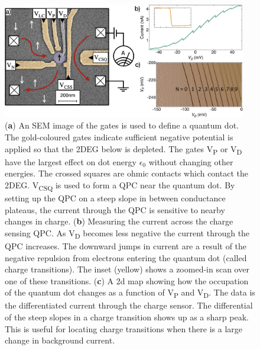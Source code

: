 \begin{figure}[!htb]
 \begin{center}
  \includegraphics[width=0.95\textwidth]{figures/ch1/crop_FiguresMaster.006.png}
  \caption[Charge sensing a quantum dot]{\label{fig:ch1/ct_intro} 
  (\textbf{a}) An SEM image of the gates is used to define a quantum dot. The gold-coloured gates indicate sufficient negative potential is applied so that the 2DEG below is depleted. The gates V\textsubscript{P} or V\textsubscript{D} have the largest effect on dot energy $\epsilon_0$ without changing other energies. The crossed squares are ohmic contacts which contact the 2DEG. V\textsubscript{CSQ} is used to form a QPC near the quantum dot. By setting up the QPC on a steep slope in between conductance plateaus, the current through the QPC is sensitive to nearby changes in charge. (\textbf{b}) Measuring the current across the charge sensing QPC. As V\textsubscript{D} becomes less negative the current through the QPC increases. The downward jumps in current are a result of the negative repulsion from electrons entering the quantum dot (called charge transitions). The inset (yellow) shows a zoomed-in scan over one of these transitions. (\textbf{c}) A 2d map showing how the occupation of the quantum dot changes as a function of V\textsubscript{P} and V\textsubscript{D}. The data is the differentiated current through the charge sensor. The differential of the steep slopes in a charge transition shows up as a sharp peak. This is useful for locating charge transitions when there is a large change in background current. 
   }
 \end{center}
\end{figure}


